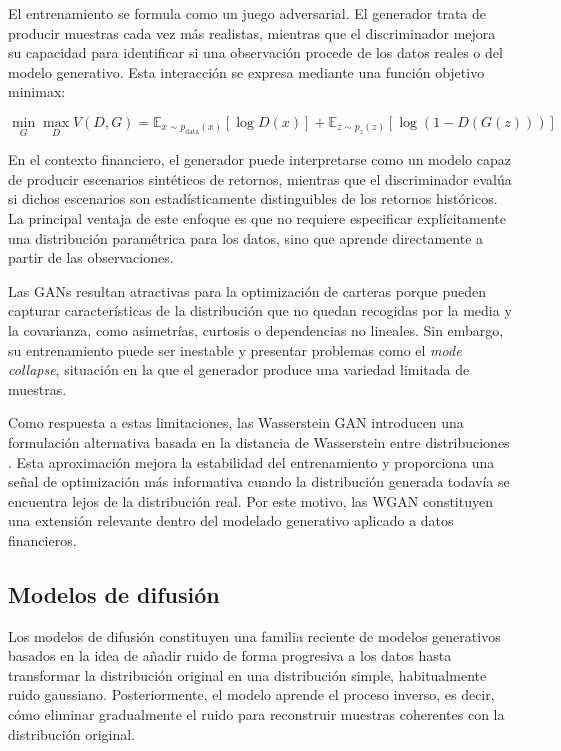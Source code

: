 El entrenamiento se formula como un juego adversarial. El generador trata de producir muestras cada vez más realistas, mientras que el discriminador mejora su capacidad para identificar si una observación procede de los datos reales o del modelo generativo. Esta interacción se expresa mediante una función objetivo minimax:

\begin{equation}
\min_G \max_D V(D,G)
=
\mathbb{E}_{x \sim p_{\text{data}}(x)}
\left[
\log D(x)
\right]
+
\mathbb{E}_{z \sim p_z(z)}
\left[
\log \left(1-D(G(z))\right)
\right]
\end{equation}

En el contexto financiero, el generador puede interpretarse como un modelo capaz de producir escenarios sintéticos de retornos, mientras que el discriminador evalúa si dichos escenarios son estadísticamente distinguibles de los retornos históricos. La principal ventaja de este enfoque es que no requiere especificar explícitamente una distribución paramétrica para los datos, sino que aprende directamente a partir de las observaciones.

Las GANs resultan atractivas para la optimización de carteras porque pueden capturar características de la distribución que no quedan recogidas por la media y la covarianza, como asimetrías, curtosis o dependencias no lineales. Sin embargo, su entrenamiento puede ser inestable y presentar problemas como el \textit{mode collapse}, situación en la que el generador produce una variedad limitada de muestras.

Como respuesta a estas limitaciones, las Wasserstein GAN introducen una formulación alternativa basada en la distancia de Wasserstein entre distribuciones \cite{arjovsky2017wasserstein}. Esta aproximación mejora la estabilidad del entrenamiento y proporciona una señal de optimización más informativa cuando la distribución generada todavía se encuentra lejos de la distribución real. Por este motivo, las WGAN constituyen una extensión relevante dentro del modelado generativo aplicado a datos financieros.

\subsection{Modelos de difusión}

Los modelos de difusión constituyen una familia reciente de modelos generativos basados en la idea de añadir ruido de forma progresiva a los datos hasta transformar la distribución original en una distribución simple, habitualmente ruido gaussiano. Posteriormente, el modelo aprende el proceso inverso, es decir, cómo eliminar gradualmente el ruido para reconstruir muestras coherentes con la distribución original.

